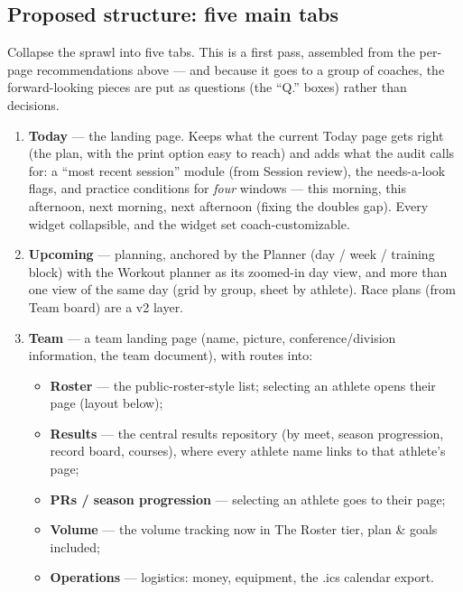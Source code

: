 \documentclass[11pt]{article}
\begin{document}
\subsection{Proposed structure: five main tabs}
\label{sec:proposal}

Collapse the sprawl into five tabs. This is a first pass, assembled from the
per-page recommendations above --- and because it goes to a group of coaches,
the forward-looking pieces are put as questions (the ``Q.'' boxes) rather
than decisions.

\begin{enumerate}
  \item \textbf{Today} --- the landing page. Keeps what the current Today page
    gets right (the plan, with the print option easy to reach) and adds what
    the audit calls for: a ``most recent session'' module (from Session
    review), the needs-a-look flags, and practice conditions for \emph{four}
    windows --- this morning, this afternoon, next morning, next afternoon
    (fixing the doubles gap). Every widget collapsible, and the widget set
    coach-customizable.
  \item \textbf{Upcoming} --- planning, anchored by the Planner (day / week /
    training block) with the Workout planner as its zoomed-in day view, and
    more than one view of the same day (grid by group, sheet by athlete).
    Race plans (from Team board) are a v2 layer.
  \item \textbf{Team} --- a team landing page (name, picture,
    conference/division information, the team document), with routes into:
    \begin{itemize}
      \item \textbf{Roster} --- the public-roster-style list; selecting an
        athlete opens their page (layout below);
      \item \textbf{Results} --- the central results repository (by meet,
        season progression, record board, courses), where every athlete name
        links to that athlete's page;
      \item \textbf{PRs / season progression} --- selecting an athlete goes
        to their page;
      \item \textbf{Volume} --- the volume tracking now in The Roster tier,
        plan \& goals included;
      \item \textbf{Operations} --- logistics: money, equipment, the .ics
        calendar export.
    \end{itemize}

\end{enumerate}
\end{document}
